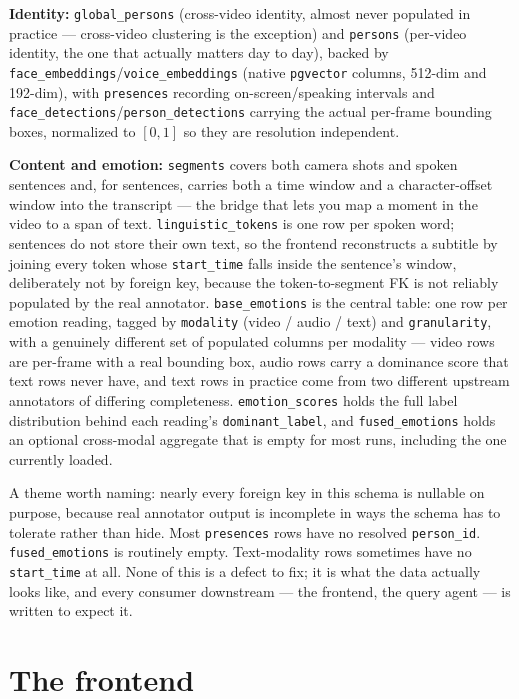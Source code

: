 \documentclass[11pt]{article}
\begin{document}
\textbf{Identity:} \texttt{global\_persons} (cross-video identity, almost
never populated in practice --- cross-video clustering is the exception) and
\texttt{persons} (per-video identity, the one that actually matters day to
day), backed by \texttt{face\_embeddings}/\texttt{voice\_embeddings}
(native \texttt{pgvector} columns, 512-dim and 192-dim), with
\texttt{presences} recording on-screen/speaking intervals and
\texttt{face\_detections}/\texttt{person\_detections} carrying the actual
per-frame bounding boxes, normalized to $[0,1]$ so they are resolution
independent.

\textbf{Content and emotion:} \texttt{segments} covers both camera shots and
spoken sentences and, for sentences, carries both a time window and a
character-offset window into the transcript --- the bridge that lets you
map a moment in the video to a span of text. \texttt{linguistic\_tokens} is
one row per spoken word; sentences do not store their own text, so the
frontend reconstructs a subtitle by joining every token whose
\texttt{start\_time} falls inside the sentence's window, deliberately not by
foreign key, because the token-to-segment FK is not reliably populated by
the real annotator. \texttt{base\_emotions} is the central table: one row
per emotion reading, tagged by \texttt{modality} (video / audio / text) and
\texttt{granularity}, with a genuinely different set of populated columns
per modality --- video rows are per-frame with a real bounding box, audio
rows carry a dominance score that text rows never have, and text rows in
practice come from two different upstream annotators of differing
completeness. \texttt{emotion\_scores} holds the full label distribution
behind each reading's \texttt{dominant\_label}, and \texttt{fused\_emotions}
holds an optional cross-modal aggregate that is empty for most runs,
including the one currently loaded.

A theme worth naming: nearly every foreign key in this schema is nullable
on purpose, because real annotator output is incomplete in ways the schema
has to tolerate rather than hide. Most \texttt{presences} rows have no
resolved \texttt{person\_id}. \texttt{fused\_emotions} is routinely empty.
Text-modality rows sometimes have no \texttt{start\_time} at all. None of
this is a defect to fix; it is what the data actually looks like, and every
consumer downstream --- the frontend, the query agent --- is written to
expect it.

\section{The frontend}
\end{document}
